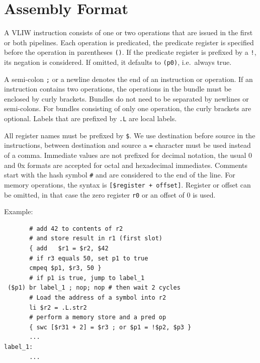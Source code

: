 \documentclass[a4paper,fontsize=10pt,twoside,DIV15,BCOR12mm,headinclude=true,footinclude=false,pagesize,bibtotoc]{scrbook}
\newcommand{\comment}[3]{

\textsf{\textbf{#1}} {\color{#3}#2}}
\newcommand{\martin}[1]{\comment{Martin}{#1}{Blue}}
\newcommand{\stefan}[1]{\comment{Stefan}{#1}{RoyalPurple}}
\renewcommand{\martin}[1]{}
\renewcommand{\stefan}[1]{}
\begin{document}
\section{Assembly Format}

\martin{This is not pasim, right?}

A VLIW instruction consists of one or two operations that are issued in the first or both pipelines.
Each operation is predicated, the predicate register is specified before the operation in parentheses \texttt{()}.
If the predicate register is prefixed by a \texttt{!}, its negation is considered.
If omitted, it defaults to \texttt{(p0)}, i.e.\ always true.

A semi-colon \texttt{;} or a newline denotes the end of an instruction or operation. If an instruction contains two operations, the operations
in the bundle must be enclosed by curly brackets. Bundles do not need to be separated by newlines or semi-colons. For bundles consisting of
only one operation, the curly brackets are optional. Labels that are prefixed by \texttt{.L} are local labels.

All register names must be prefixed by \texttt{\$}.
We use destination before source in the instructions, between destination and source a \texttt{=} character must be used instead of a comma.
Immediate values are not prefixed for decimal notation, the usual 0 and 0x formats are accepted for octal and hexadecimal immediates.
Comments start with the hash symbol \texttt{\#} and are considered to the end of the line. For memory operations, the syntax is
\texttt{[\$register + offset]}. Register or offset can be omitted, in that case the zero register \texttt{r0} or an offset of $0$ is used.

Example:
\begin{verbatim}
       # add 42 to contents of r2
       # and store result in r1 (first slot)
       { add   $r1 = $r2, $42
       # if r3 equals 50, set p1 to true
       cmpeq $p1, $r3, 50 }
       # if p1 is true, jump to label_1
 ($p1) br label_1 ; nop; nop # then wait 2 cycles
       # Load the address of a symbol into r2
       li $r2 = .L.str2
       # perform a memory store and a pred op
       { swc [$r31 + 2] = $r3 ; or $p1 = !$p2, $p3 }
       ...
label_1:
       ...
\end{verbatim}

\stefan{TODO: some words about units of .align, .size, ..; describe .fstart;
I would like to move the assembly format description out into a public repo (patmos-misc) and merge
it with a compiler usage manual, ELF file format and backend description, though.}
\end{document}
